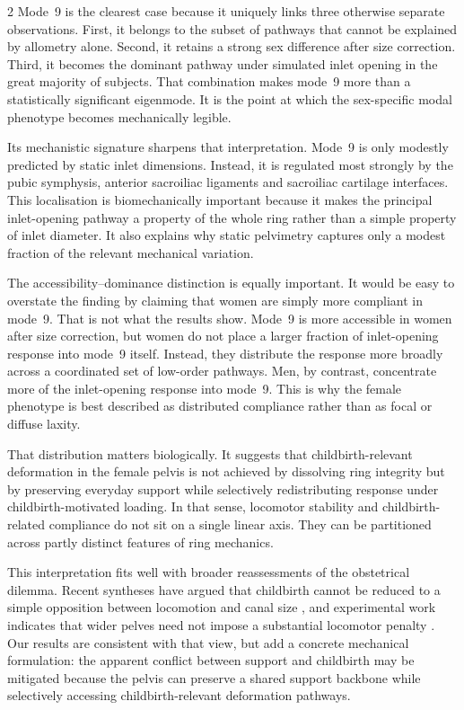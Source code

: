 \documentclass[openacc]{rsproca_new}
\begin{document}
\begin{multicols}{2}
Mode~9 is the clearest case because it uniquely links three otherwise separate observations. First, it belongs to the subset of pathways that cannot be explained by allometry alone. Second, it retains a strong sex difference after size correction. Third, it becomes the dominant pathway under simulated inlet opening in the great majority of subjects. That combination makes mode~9 more than a statistically significant eigenmode. It is the point at which the sex-specific modal phenotype becomes mechanically legible.

Its mechanistic signature sharpens that interpretation. Mode~9 is only modestly predicted by static inlet dimensions. Instead, it is regulated most strongly by the pubic symphysis, anterior sacroiliac ligaments and sacroiliac cartilage interfaces. This localisation is biomechanically important because it makes the principal inlet-opening pathway a property of the whole ring rather than a simple property of inlet diameter. It also explains why static pelvimetry captures only a modest fraction of the relevant mechanical variation.

The accessibility--dominance distinction is equally important. It would be easy to overstate the finding by claiming that women are simply more compliant in mode~9. That is not what the results show. Mode~9 is more accessible in women after size correction, but women do not place a larger fraction of inlet-opening response into mode~9 itself. Instead, they distribute the response more broadly across a coordinated set of low-order pathways. Men, by contrast, concentrate more of the inlet-opening response into mode~9. This is why the female phenotype is best described as distributed compliance rather than as focal or diffuse laxity.

That distribution matters biologically. It suggests that childbirth-relevant deformation in the female pelvis is not achieved by dissolving ring integrity but by preserving everyday support while selectively redistributing response under childbirth-motivated loading. In that sense, locomotor stability and childbirth-related compliance do not sit on a single linear axis. They can be partitioned across partly distinct features of ring mechanics.

This interpretation fits well with broader reassessments of the obstetrical dilemma. Recent syntheses have argued that childbirth cannot be reduced to a simple opposition between locomotion and canal size \cite{Pavlicev2020,Haeusler2021,Grunstra2023}, and experimental work indicates that wider pelves need not impose a substantial locomotor penalty \cite{Warrener2015}. Our results are consistent with that view, but add a concrete mechanical formulation: the apparent conflict between support and childbirth may be mitigated because the pelvis can preserve a shared support backbone while selectively accessing childbirth-relevant deformation pathways.


\end{multicols}
\end{document}
